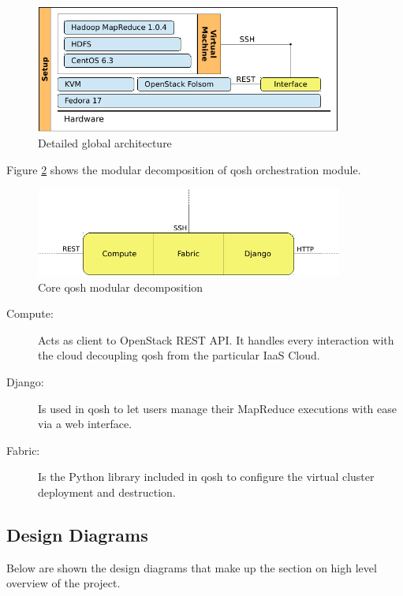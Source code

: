 \begin{figure}[tbp]
\begin{center}
\includegraphics[width=0.9\textwidth]{imagenes/022.pdf}
 \caption{Detailed global architecture}
\label{fig:arquitecturadetalle}
\end{center}
\end{figure}

Figure \ref{fig:arquitecturainterfaz} shows the modular decomposition of qosh orchestration module.

\begin{figure}[bp]
\begin{center}
\includegraphics[width=0.9\textwidth]{imagenes/023.pdf}
 \caption{Core qosh modular decomposition}
\label{fig:arquitecturainterfaz}
\end{center}
\end{figure}

\begin{description}
 \item[Compute:] Acts as client to OpenStack REST API. It handles every interaction with the cloud decoupling qosh from the particular IaaS Cloud.
 \item[Django:] Is used in qosh to let users manage their MapReduce executions with ease via a web interface.
 \item[Fabric:] Is the Python library included in qosh to configure the virtual cluster deployment and destruction.
\end{description}

\subsection{Design Diagrams}\label{subsec:diagramasaltonivel}
\noindent Below are shown the design diagrams that make up the section on high level overview of the project.

